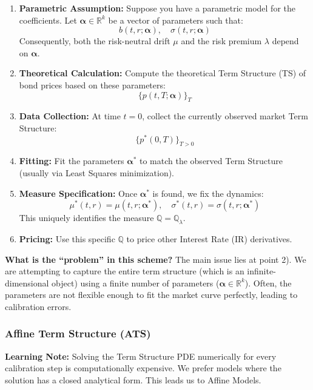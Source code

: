 \documentclass[12pt,a4paper]{article}
\theoremstyle{definition}
\newcommand{\R}{\mathbb{R}}
\newcommand{\Q}{\mathbb{Q}}
\begin{document}
\begin{enumerate}
\item \textbf{Parametric Assumption:} Suppose you have a parametric model for the coefficients. Let $\boldsymbol{\alpha} \in \R^k$ be a vector of parameters such that:
\[
b(t,r;\boldsymbol{\alpha}), \quad \sigma(t,r;\boldsymbol{\alpha})
\]
Consequently, both the risk-neutral drift $\mu$ and the risk premium $\lambda$ depend on $\boldsymbol{\alpha}$.

\item \textbf{Theoretical Calculation:} Compute the theoretical Term Structure (TS) of bond prices based on these parameters:
\[
\{p(t,T;\boldsymbol{\alpha})\}_T
\]

\item \textbf{Data Collection:} At time $t=0$, collect the currently observed market Term Structure:
\[
\{p^*(0,T)\}_{T>0}
\]

\item \textbf{Fitting:} Fit the parameters $\boldsymbol{\alpha}^*$ to match the observed Term Structure (usually via Least Squares minimization).

\item \textbf{Measure Specification:} Once $\boldsymbol{\alpha}^*$ is found, we fix the dynamics:
\[
\mu^*(t,r) = \mu(t,r;\boldsymbol{\alpha}^*), \quad \sigma^*(t,r) = \sigma(t,r;\boldsymbol{\alpha}^*)
\]
This uniquely identifies the measure $\Q = \Q_\lambda$.

\item \textbf{Pricing:} Use this specific $\Q$ to price other Interest Rate (IR) derivatives.
\end{enumerate}

\textbf{What is the ``problem'' in this scheme?} The main issue lies at point 2). We are attempting to capture the entire term structure (which is an infinite-dimensional object) using a finite number of parameters ($\boldsymbol{\alpha} \in \R^k$). Often, the parameters are not flexible enough to fit the market curve perfectly, leading to calibration errors.

\subsubsection{Affine Term Structure (ATS)}

\textbf{Learning Note:} Solving the Term Structure PDE numerically for every calibration step is computationally expensive. We prefer models where the solution has a closed analytical form. This leads us to Affine Models.
\end{document}
